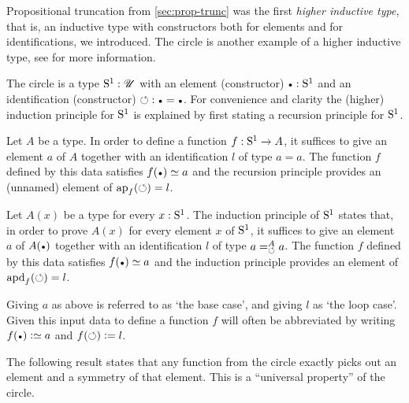 Propositional truncation from \cref{sec:prop-trunc} was
the first \emph{higher inductive type}, that is, an inductive type
with constructors both for elements and for identifications,
we introduced. 
The circle is another example of a higher inductive type,
see \cite[Ch. 6]{hottbook} for more information.

\begin{definition}
  \label{def:circle}
The circle is a type ${\mathrm{S}^1}:{\mathscr{U}}$ with an element (constructor) $\base : \Sc$ and 
an identification (constructor) ${\Sloop}: \base=\base$. For convenience and
clarity the (higher) induction principle for ${\mathrm{S}^1}$ is explained
by first stating a recursion principle for ${\mathrm{S}^1}$.

Let $A$ be a type. In order to define a function $f:{\mathrm{S}^1}\to A$,
it suffices to give an element $a$ of $A$ together with an
identification $l$ of type $a=a$. The function $f$ defined
by this data satisfies $f(\base)\jdeq a$ and 
the recursion principle provides an (unnamed) element of 
$\ap{f}(\Sloop)=l$.

Let $A(x)$ be a type for every $x:{\mathrm{S}^1}$. The induction principle of ${\mathrm{S}^1}$
states that, in order to prove $A(x)$ for every element $x$ of ${\mathrm{S}^1}$,
it suffices to give an element $a$ of $A(\base)$ together with an
identification $l$ of type $\pathover{a}{A}{\Sloop}{a}$. 
The function $f$ defined by this data satisfies $f(\base)\jdeq a$ and 
the induction principle provides an element of $\apd{f}(\Sloop)=l$.
\end{definition}

Giving $a$ as above is referred to as `the base case', and
giving $l$ as `the loop case'. Given this input data to define
a function $f$ will often be abbreviated by writing
$f(\base)\defeq a$ and $f(\circlearrowleft)\mathrel{\vcentcolon=} l$.

The following result states that any function from the circle exactly 
picks out an element and a symmetry of that element.
This is a ``universal property'' of the circle.

